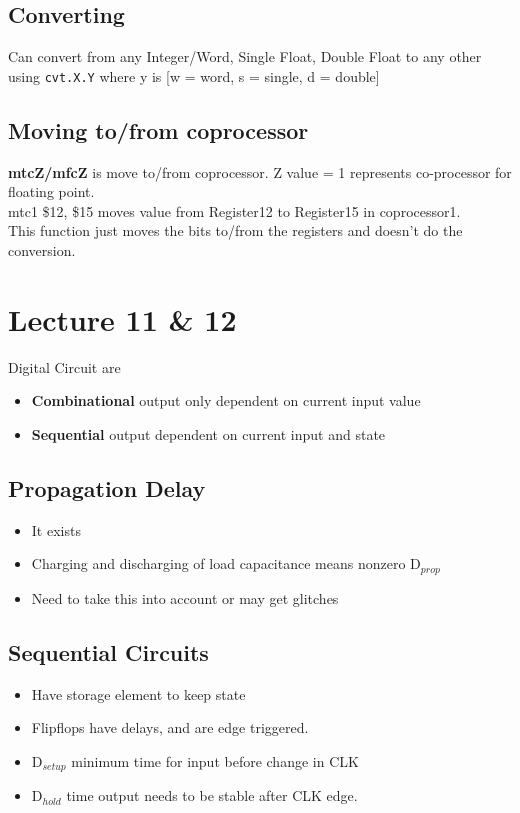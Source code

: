 \documentclass{article}
\begin{document}
	\subsection*{Converting}
		Can convert from any Integer/Word, Single Float, Double Float to any other using \texttt{cvt.X.Y} where y is [w = word, s = single, d = double]

	\subsection*{Moving to/from coprocessor}
	\textbf{mtcZ/mfcZ} is move to/from coprocessor. Z value = 1 represents co-processor for floating point.\\

	mtc1 \$12, \$15 moves value from Register12 to Register15 in coprocessor1.\\

	This function just moves the bits to/from the registers and doesn't do the conversion.

\section{Lecture 11 \& 12}
	Digital Circuit are
	\begin{itemize}
		\item \textbf{Combinational}	output only dependent on current input value
		\item \textbf{Sequential} 	output dependent on current input and state
	\end{itemize}

	\subsection*{Propagation Delay}
		\begin{itemize}
			\item It exists
			\item Charging and discharging of load capacitance means nonzero D$_{prop}$
			\item Need to take this into account or may get glitches
		\end{itemize}

	\subsection*{Sequential Circuits}
		\begin{itemize}
			\item Have storage element to keep state
			\item Flipflops have delays, and are edge triggered.
			\item D$_{setup}$ minimum time for input before change in CLK
			\item D$_{hold}$ time output needs to be stable after CLK edge.

		\end{itemize}
\end{document}
